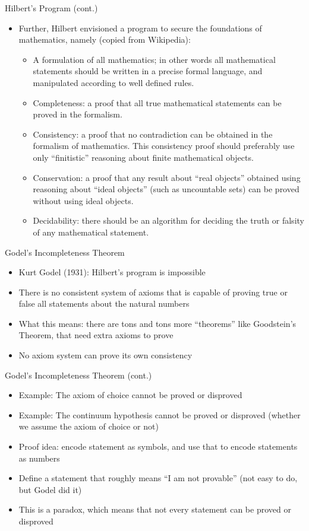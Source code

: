 \documentclass{beamer}
\begin{document}
\begin{frame}{Hilbert's Program (cont.)}
\begin{itemize}
\item Further, Hilbert envisioned a program to secure the foundations of mathematics, namely (copied from Wikipedia):
\begin{itemize}
\item A formulation of all mathematics; in other words all mathematical statements should be written in a precise formal language, and manipulated according to well defined rules.
\item Completeness: a proof that all true mathematical statements can be proved in the formalism.
\item Consistency: a proof that no contradiction can be obtained in the formalism of mathematics. This consistency proof should preferably use only ``finitistic'' reasoning about finite mathematical objects.
\item Conservation: a proof that any result about ``real objects'' obtained using reasoning about ``ideal objects'' (such as uncountable sets) can be proved without using ideal objects.
\item Decidability: there should be an algorithm for deciding the truth or falsity of any mathematical statement.
\end{itemize}
\end{itemize}
\end{frame}

\begin{frame}{Godel's Incompleteness Theorem}
\begin{itemize}
\item Kurt Godel (1931): Hilbert's program is impossible
\item There is no consistent system of axioms that is capable of proving true or false all statements about the natural numbers
\item What this means: there are tons and tons more ``theorems'' like Goodstein's Theorem, that need extra axioms to prove
\item No axiom system can prove its own consistency
\end{itemize}
\end{frame}

\begin{frame}{Godel's Incompleteness Theorem (cont.)}
\begin{itemize}
\item Example: The axiom of choice cannot be proved or disproved
\item Example: The continuum hypothesis cannot be proved or disproved (whether we assume the axiom of choice or not)
\item Proof idea: encode statement as symbols, and use that to encode statements as numbers
\item Define a statement that roughly means ``I am not provable'' (not easy to do, but Godel did it)
\item This is a paradox, which means that not every statement can be proved or disproved
\end{itemize}
\end{frame}
\end{document}
